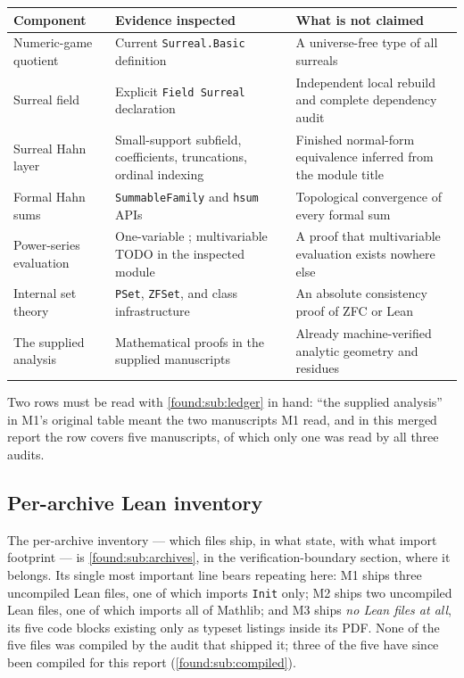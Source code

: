 \documentclass[11pt,letterpaper]{article}
\numberwithin{equation}{section}
\theoremstyle{definition}
\theoremstyle{remark}
\begin{document}
\begin{longtable}{@{}P{0.27\textwidth}P{0.34\textwidth}P{0.33\textwidth}@{}}
\toprule
Component & Evidence inspected & What is not claimed\\
\midrule\endhead
Numeric-game quotient & Current \texttt{Surreal.Basic} definition & A universe-free type of all surreals\\[0.35em]
Surreal field & Explicit \texttt{Field Surreal} declaration & Independent local rebuild and complete dependency audit\\[0.35em]
Surreal Hahn layer & Small-support subfield, coefficients, truncations, ordinal indexing & Finished normal-form equivalence inferred from the module title\\[0.35em]
Formal Hahn sums & \texttt{SummableFamily} and \texttt{hsum} APIs & Topological convergence of every formal sum\\[0.35em]
Power-series evaluation & One-variable ; multivariable TODO in the inspected module & A proof that multivariable evaluation exists nowhere else\\[0.35em]
Internal set theory & \texttt{PSet}, \texttt{ZFSet}, and class infrastructure & An absolute consistency proof of ZFC or Lean\\[0.35em]
The supplied analysis & Mathematical proofs in the supplied manuscripts & Already machine-verified analytic geometry and residues\\
\bottomrule
\end{longtable}

\noindent Two rows must be read with \cref{found:sub:ledger} in hand: ``the
supplied analysis'' in M1's original table meant the two manuscripts M1 read,
and in this merged report the row covers five manuscripts, of which only one was
read by all three audits.

\subsection{Per-archive Lean inventory}
\label{found:sub:archiveinventory}
The per-archive inventory --- which files ship, in what state, with what import
footprint --- is \cref{found:sub:archives}, in the verification-boundary
section, where it belongs. Its single most important line bears repeating here:
M1 ships three uncompiled Lean files, one of which imports \texttt{Init} only;
M2 ships two uncompiled Lean files, one of which imports all of Mathlib; and M3
ships \emph{no Lean files at all}, its five code blocks existing only as
typeset listings inside its PDF. None of the five files was compiled by the audit that shipped it; three of
the five have since been compiled for this report (\cref{found:sub:compiled}).
\end{document}
